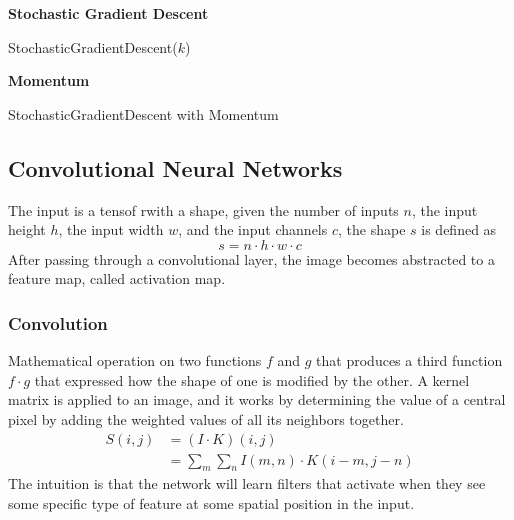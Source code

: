 \documentclass[a4paper,6pt,twocolumn,fleqn]{article}
\begin{document}
\textbf{Stochastic Gradient Descent}

\begin{algorithm}
    \caption{StochasticGradientDescent($k$)}
    \label{alg:stochastic_gradient_descent}
\end{algorithm}

\textbf{Momentum}

\begin{algorithm}
    \caption{StochasticGradientDescent with Momentum}
    \label{alg:stochastic_gradient_descent_momentum}
\end{algorithm}
\subsection{Convolutional Neural Networks} %
The input is a tensof rwith a shape, given the number of inputs \(n\), the input height \(h\), the input width \(w\), and the input channels \(c\), the shape \(s\) is defined as
\begin{equation}
    s = n \cdot h \cdot w \cdot c
\end{equation}
After passing through a convolutional layer, the image becomes abstracted to a feature map, called activation map.
\subsubsection{Convolution} %
Mathematical operation on two functions \(f\) and \(g\) that produces a third function \(f \cdot g\) that expressed how the shape of one is modified by the other. A kernel matrix is applied to an image, and it works by determining the value of a central pixel by adding the weighted values of all its neighbors together.
\begin{align}
    S(i,j) &= (I \cdot K)(i,j)\\ 
    &= \sum_m \sum_n I(m,n) \cdot K(i-m,j-n)
\end{align}
The intuition is that the network will learn filters that activate when they see some specific type of feature at some spatial position in the input.
\end{document}
